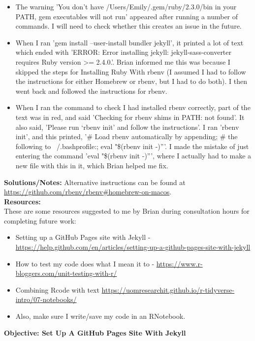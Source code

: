 \documentclass{article}
\begin{document}
\begin{FlushLeft}
\begin{itemize}
    \item The warning 'You don't have /Users/Emily/.gem/ruby/2.3.0/bin in your PATH, gem executables will not run' appeared after running a number of commands. I will need to check whether this creates an issue in the future.
    \item When I ran 'gem install --user-install bundler jekyll', it printed a lot of text which ended with 'ERROR:  Error installing jekyll:
	jekyll-sass-converter requires Ruby version \textgreater= 2.4.0.'. Brian informed me this was because I skipped the steps for Installing Ruby With rbenv (I assumed I had to follow the instructions for either Homebrew or rbenv, but I had to do both). I then went back and followed the instructions for rbenv.
    \item When I ran the command to check I had installed rbenv correctly, part of the text was in red, and said 'Checking for rbenv shims in PATH: not found'. It also said, 'Please run `rbenv init' and follow the instructions'. I ran 'rbenv init', and this printed, '\# Load rbenv automatically by appending; \# the following to ~/.bash\textunderscore profile:; eval "\$(rbenv init -)”'. I made the mistake of just entering the command 'eval "\$(rbenv init -)”', where I actually had to make a new file with this in it, which Brian helped me fix.
\end{itemize}
\textbf{Solutions/Notes:} Alternative instructions can be found at \url{https://github.com/rbenv/rbenv#homebrew-on-macos}.\\
\vspace{5mm}
\textbf{Resources:}\\ 
These are some resources suggested to me by Brian during consultation hours for completing future work:
\begin{itemize}
    \item Setting up a GitHub Pages site with Jekyll - \url{https://help.github.com/en/articles/setting-up-a-github-pages-site-with-jekyll}
    \item How to test my code does what I mean it to - \url{https://www.r-bloggers.com/unit-testing-with-r/}
    \item Combining Rcode with text \url{https://uomresearchit.github.io/r-tidyverse-intro/07-notebooks/}
    \item Also, make sure I write/save my code in an RNotebook.
\end{itemize}
\vspace{5mm}
\textbf{Objective: Set Up A GitHub Pages Site With Jekyll}\\ 

\end{FlushLeft}
\end{document}
